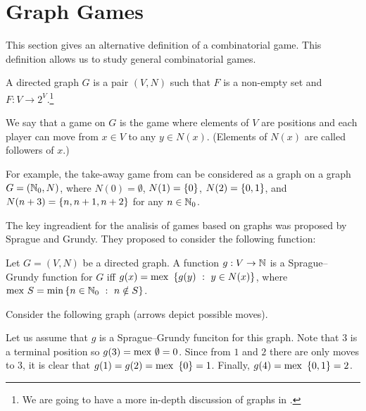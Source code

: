 \chapter{Graph Games}
This section gives an alternative definition of a combinatorial game.
This definition allows us to study general combinatorial games.
\begin{definition}
  A directed graph $G$ is a pair $(V, N)$ such that $F$ is a non-empty set and
  $F : V \to 2^V$.\footnote{We are going to have a more in-depth discussion
  of graphs in .}

  We say that a game on $G$ is the game where elements of $V$ are positions
  and each player can move from $x \in V$ to any $y \in N(x)$. (Elements of
  $N(x)$ are called followers of $x$.)
\end{definition}

For example, the take-away game from 
can be considered as a graph on a graph $G = ({\mathbb{N}}_0, N)$,
where $N(0) = \emptyset$, $N(1) = \set{0}$, $N(2) = \set{0, 1}$, and
$N(n + 3) = \set{n, n + 1, n + 2}$ for any $n \in {\mathbb{N}}_0$.

The key ingreadient for the analisis of games based on graphs was proposed
by Sprague and Grundy. They proposed to consider the following function:
\begin{definition}
  Let $G = (V, N)$ be a directed graph. A function $g : V \to {\mathbb{N}}$ is a
  Sprague--Grundy function for $G$ iff
  $g(x) = \mex\set[y \in N(x)]{g(y)}$, where
  $\mex S = \min \set[n \notin S]{n \in \N_0}$.
\end{definition}


Consider the following graph (arrows depict possible moves).
\begin{center}
\end{center}
Let us assume that $g$ is a Sprague--Grundy funciton for this graph.
Note that $3$ is a terminal position so $g(3) = \mathrm{mex}~ \emptyset = 0$.
Since from $1$ and $2$ there are only moves to $3$, it is clear that
$g(1) = g(2) = \mex \set{0} = 1$. Finally, $g(4) = \mex \set{0, 1} = 2$.

